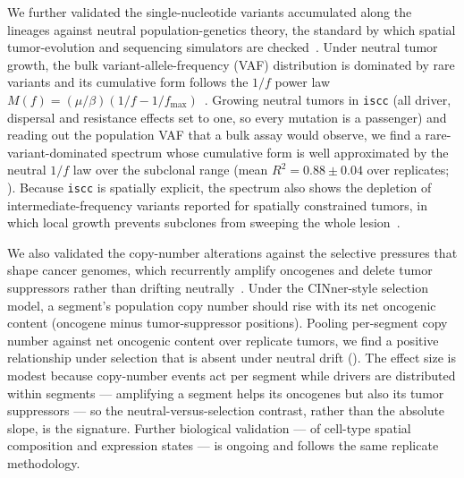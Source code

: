 \documentclass{article}
\begin{document}
We further validated the single-nucleotide variants accumulated along the lineages against
neutral population-genetics theory, the standard by which spatial tumor-evolution and sequencing
simulators are checked~\cite{angaroni_jspace_2022, williams_identification_2016}. Under neutral
tumor growth, the bulk variant-allele-frequency (VAF) distribution is dominated by rare variants
and its cumulative form follows the $1/f$ power law $M(f) = (\mu/\beta)(1/f -
1/f_{\max})$~\cite{williams_identification_2016}. Growing neutral
tumors in \texttt{iscc} (all driver, dispersal and resistance effects set to one, so every
mutation is a passenger) and reading out the population VAF that a bulk assay would observe, we
find a rare-variant-dominated spectrum whose cumulative form is well approximated by the neutral
$1/f$ law over the subclonal range (mean $R^2 = 0.88 \pm 0.04$ over replicates;
). Because \texttt{iscc} is spatially explicit, the spectrum also shows
the depletion of intermediate-frequency variants reported for spatially constrained tumors, in
which local growth prevents subclones from sweeping the whole lesion~\cite{sun_between-region_2017,
chkhaidze_spatially_2019}.

We also validated the copy-number alterations against the selective pressures that shape cancer
genomes, which recurrently amplify oncogenes and delete tumor suppressors rather than drifting
neutrally~\cite{beroukhim_landscape_2010,davoli_cumulative_2013}. Under the CINner-style
selection model, a segment's population copy number should rise with its net oncogenic content
(oncogene minus tumor-suppressor positions). Pooling per-segment copy number against net
oncogenic content over replicate tumors, we find a positive relationship under selection that is
absent under neutral drift (). The effect size is modest because
copy-number events act per segment while drivers are distributed within segments --- amplifying a
segment helps its oncogenes but also its tumor suppressors --- so the neutral-versus-selection
contrast, rather than the absolute slope, is the signature. Further biological validation --- of
cell-type spatial composition and expression states --- is ongoing and follows the same
replicate methodology.
\end{document}
